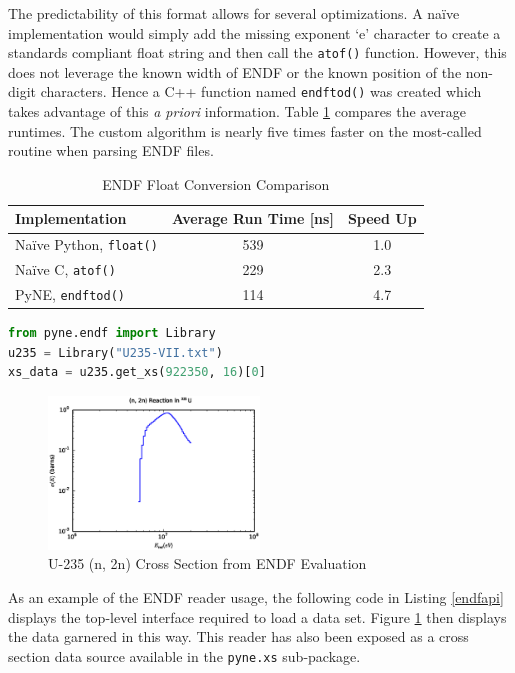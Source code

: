 \documentclass{anstrans}
\begin{document}
The predictability of this format allows for several optimizations.  A na\"{i}ve 
implementation would simply add the missing exponent `e' character to create
a standards compliant float string and then call the \texttt{atof()} function.  
However, this does not leverage the known width of ENDF or the known position of
the non-digit characters.  Hence a C++ function named \texttt{endftod()} was 
created which takes advantage of this \emph{a priori} information.  
Table \ref{endftod} compares the average runtimes. The custom algorithm is nearly 
five times faster on the most-called routine when parsing ENDF files.

\begin{table}
\centering
\caption{ENDF Float Conversion Comparison}
\label{endftod}
{\small
\begin{tabular}[htbp]{lcc}
\toprule
\textbf{Implementation} & \textbf{Average Run Time [ns]} & \textbf{Speed Up} \\
\midrule
Na\"{i}ve Python, \texttt{float()} & 539 & 1.0 \\
Na\"{i}ve C, \texttt{atof()} & 229 & 2.3 \\
PyNE, \texttt{endftod()} & 114 & 4.7 \\
\bottomrule
\end{tabular}
}
\end{table}

\begin{lstlisting}[language=Python,basicstyle=\scriptsize\ttfamily,frame=single,caption=ENDF Reader API,label=endfapi]
from pyne.endf import Library
u235 = Library("U235-VII.txt")
xs_data = u235.get_xs(922350, 16)[0]
\end{lstlisting}

\begin{figure}[htbp]
  \centering
  \includegraphics[width=0.5\textwidth]{u235_2n.eps}
  \caption{U-235 (n, 2n) Cross Section from ENDF Evaluation}
  \label{u235}
\end{figure}

As an example of the ENDF reader usage, the following code in Listing \ref{endfapi} 
displays the top-level interface required to load a data set.  Figure \ref{u235} 
then displays the data garnered in this way.  This reader has also
been exposed as a cross section data source available in the \texttt{pyne.xs} 
sub-package.
\end{document}
